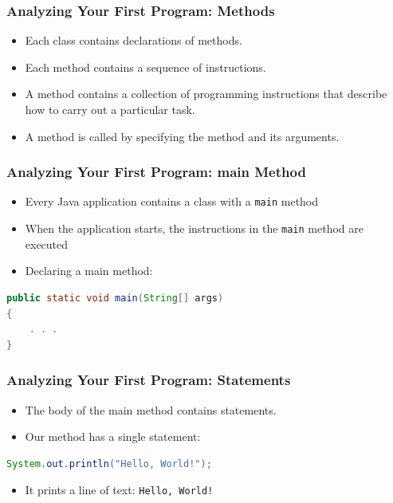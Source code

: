 \documentclass{beamer}
\begin{document}
\begin{frame}[t,fragile] \frametitle{Analyzing Your First Program: Methods} %
    \begin{itemize}
        \item Each class contains declarations of methods.
        \item Each method contains a sequence of instructions.
        \item A method contains a collection of programming instructions that describe how to carry out a particular task.
        \item A method is called by specifying the method and its arguments.
    \end{itemize}
\end{frame}

\begin{frame}[t,fragile] \frametitle{Analyzing Your First Program: main Method} %
    \begin{itemize}
        \item Every Java application contains a class with a \texttt{main} method
        \item When the application starts, the instructions in the \texttt{main} method are executed
        \item Declaring a main method:
    \end{itemize}
\begin{lstlisting}[language=Java]
public static void main(String[] args)
{
    . . .
}
\end{lstlisting}
\end{frame}

\begin{frame}[t,fragile] \frametitle{Analyzing Your First Program: Statements} %
    \begin{itemize}
        \item The body of the main method contains statements.
        \item Our method has a single statement:
    \end{itemize}
\begin{lstlisting}[language=Java]
System.out.println("Hello, World!");
\end{lstlisting}
    \begin{itemize}
        \item It prints a line of text: \texttt{Hello, World!}
    \end{itemize}
\end{frame}
\end{document}
